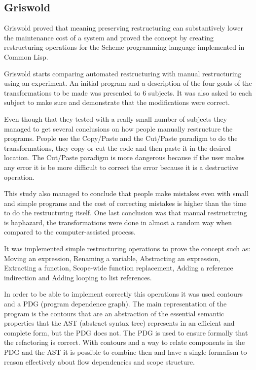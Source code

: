 
\subsection{Griswold}
Griswold \cite{griswold1991program} proved that meaning preserving restructuring can substantively lower the maintenance cost of a system and proved the concept by creating restructuring operations for the Scheme programming language implemented in Common Lisp.


Griswold starts comparing automated restructuring with manual restructuring using an experiment. 
An initial program and a description of the four goals of the transformations to be made was presented to 6 subjects. It was also asked to each subject to make sure and demonstrate that the modifications were correct.

Even though that they tested with a really small number of subjects they managed to get several conclusions on how people manually restructure the programs.
People use the Copy/Paste and the Cut/Paste paradigm to do the transformations, they copy or cut the code and then paste it in the desired location.
The Cut/Paste paradigm is more dangerous because if the user makes any error it is be more difficult to correct the error because it is a destructive operation.

This study also managed to conclude that people make mistakes even with small and simple programs and the cost of correcting mistakes is higher than the time to do the restructuring itself.
One last conclusion was that manual restructuring is haphazard, the transformations were done in almost a random way when compared to the computer-assisted process.

It was implemented simple restructuring operations to prove the concept such as: Moving an expression, Renaming a variable, Abstracting an expression, Extracting a function, Scope-wide function replacement, Adding a reference indirection and Adding looping to list references.

In order to be able to implement correctly this operations it was used contours and a PDG (program dependence graph). 
The main representation of the program is the contours that are an abstraction of the essential semantic properties that the AST (abstract syntax tree) represents in an efficient and complete form, but the PDG does not.
The PDG is used to ensure formally that the refactoring is correct.
With contours and a way to relate components in the PDG and the AST it is possible to combine then and have a single formalism to reason effectively about flow dependencies and scope structure.

